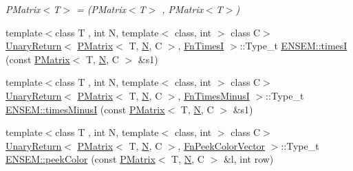 \begin{DoxyCompactItemize}
\begin{DoxyCompactList}\small\item\em P\+Matrix$<$\+T$>$ = (P\+Matrix$<$\+T$>$ , P\+Matrix$<$\+T$>$) \end{DoxyCompactList}\item 
{\footnotesize template$<$class T , int N, template$<$ class, int $>$ class C$>$ }\\\mbox{\hyperlink{structENSEM_1_1UnaryReturn}{Unary\+Return}}$<$ \mbox{\hyperlink{classENSEM_1_1PMatrix}{P\+Matrix}}$<$ T, \mbox{\hyperlink{adat__devel_2lib_2hadron_2operator__name__util_8cc_a7722c8ecbb62d99aee7ce68b1752f337}{N}}, C $>$, \mbox{\hyperlink{structENSEM_1_1FnTimesI}{Fn\+TimesI}} $>$\+::Type\+\_\+t \mbox{\hyperlink{group__primmatrix_ga9f1d3892badcfa2bf78d97c42c8a05e5}{E\+N\+S\+E\+M\+::timesI}} (const \mbox{\hyperlink{classENSEM_1_1PMatrix}{P\+Matrix}}$<$ T, \mbox{\hyperlink{adat__devel_2lib_2hadron_2operator__name__util_8cc_a7722c8ecbb62d99aee7ce68b1752f337}{N}}, C $>$ \&s1)
\item 
{\footnotesize template$<$class T , int N, template$<$ class, int $>$ class C$>$ }\\\mbox{\hyperlink{structENSEM_1_1UnaryReturn}{Unary\+Return}}$<$ \mbox{\hyperlink{classENSEM_1_1PMatrix}{P\+Matrix}}$<$ T, \mbox{\hyperlink{adat__devel_2lib_2hadron_2operator__name__util_8cc_a7722c8ecbb62d99aee7ce68b1752f337}{N}}, C $>$, \mbox{\hyperlink{structENSEM_1_1FnTimesMinusI}{Fn\+Times\+MinusI}} $>$\+::Type\+\_\+t \mbox{\hyperlink{group__primmatrix_ga937a4152dd7d0ceaec303ddbdbaf5a98}{E\+N\+S\+E\+M\+::times\+MinusI}} (const \mbox{\hyperlink{classENSEM_1_1PMatrix}{P\+Matrix}}$<$ T, \mbox{\hyperlink{adat__devel_2lib_2hadron_2operator__name__util_8cc_a7722c8ecbb62d99aee7ce68b1752f337}{N}}, C $>$ \&s1)
\item 
{\footnotesize template$<$class T , int N, template$<$ class, int $>$ class C$>$ }\\\mbox{\hyperlink{structENSEM_1_1UnaryReturn}{Unary\+Return}}$<$ \mbox{\hyperlink{classENSEM_1_1PMatrix}{P\+Matrix}}$<$ T, \mbox{\hyperlink{adat__devel_2lib_2hadron_2operator__name__util_8cc_a7722c8ecbb62d99aee7ce68b1752f337}{N}}, C $>$, \mbox{\hyperlink{structENSEM_1_1FnPeekColorVector}{Fn\+Peek\+Color\+Vector}} $>$\+::Type\+\_\+t \mbox{\hyperlink{group__primmatrix_ga95fe2504ecc461173cb780afe6dbbbf4}{E\+N\+S\+E\+M\+::peek\+Color}} (const \mbox{\hyperlink{classENSEM_1_1PMatrix}{P\+Matrix}}$<$ T, \mbox{\hyperlink{adat__devel_2lib_2hadron_2operator__name__util_8cc_a7722c8ecbb62d99aee7ce68b1752f337}{N}}, C $>$ \&l, int row)
\item 

\end{DoxyCompactItemize}
